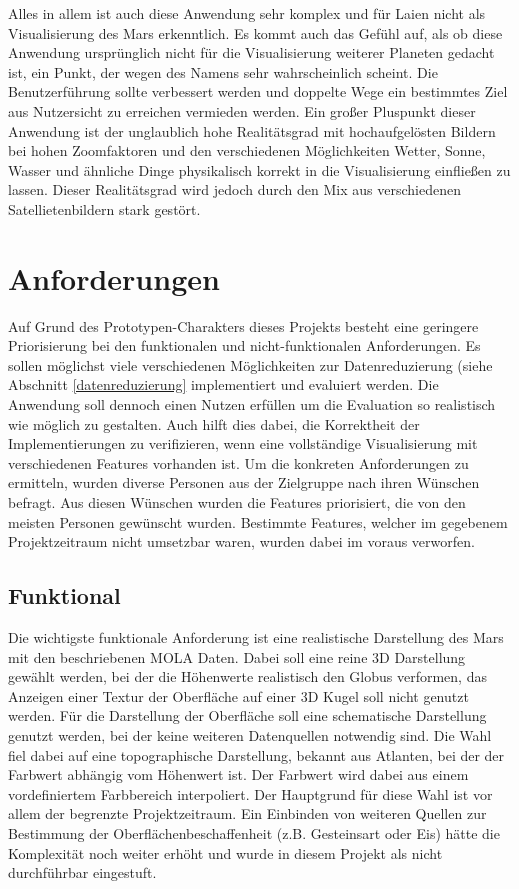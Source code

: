 Alles in allem ist auch diese Anwendung sehr komplex und für Laien nicht als Visualisierung des Mars erkenntlich. Es kommt auch das Gefühl auf, als ob diese Anwendung ursprünglich nicht für die Visualisierung weiterer Planeten gedacht ist, ein Punkt, der wegen des Namens sehr wahrscheinlich scheint. Die Benutzerführung sollte verbessert werden und doppelte Wege ein bestimmtes Ziel aus Nutzersicht zu erreichen vermieden werden. Ein großer Pluspunkt dieser Anwendung ist der unglaublich hohe Realitätsgrad mit hochaufgelösten Bildern bei hohen Zoomfaktoren und den verschiedenen Möglichkeiten Wetter, Sonne, Wasser und ähnliche Dinge physikalisch korrekt in die Visualisierung einfließen zu lassen. Dieser Realitätsgrad wird jedoch durch den Mix aus verschiedenen Satellietenbildern stark gestört.

\section{Anforderungen}
Auf Grund des Prototypen-Charakters dieses Projekts besteht eine geringere Priorisierung bei den funktionalen und nicht-funktionalen Anforderungen. Es sollen möglichst viele verschiedenen Möglichkeiten zur Datenreduzierung (siehe Abschnitt \ref{datenreduzierung} implementiert und evaluiert werden. Die Anwendung soll dennoch einen Nutzen erfüllen um die Evaluation so realistisch wie möglich zu gestalten. Auch hilft dies dabei, die Korrektheit der Implementierungen zu verifizieren, wenn eine vollständige Visualisierung mit verschiedenen Features vorhanden ist. Um die konkreten Anforderungen zu ermitteln, wurden diverse Personen aus der Zielgruppe nach ihren Wünschen befragt. Aus diesen Wünschen wurden die Features priorisiert, die von den meisten Personen gewünscht wurden. Bestimmte Features, welcher im gegebenem Projektzeitraum nicht umsetzbar waren, wurden dabei im voraus verworfen. 

\subsection{Funktional}
Die wichtigste funktionale Anforderung ist eine realistische Darstellung des Mars mit den beschriebenen MOLA Daten. Dabei soll eine reine 3D Darstellung gewählt werden, bei der die Höhenwerte realistisch den Globus verformen, das Anzeigen einer Textur der Oberfläche auf einer 3D Kugel soll nicht genutzt werden. Für die Darstellung der Oberfläche soll eine schematische Darstellung genutzt werden, bei der keine weiteren Datenquellen notwendig sind. Die Wahl fiel dabei auf eine topographische Darstellung, bekannt aus Atlanten, bei der der Farbwert abhängig vom Höhenwert ist. Der Farbwert wird dabei aus einem vordefiniertem Farbbereich interpoliert. Der Hauptgrund für diese Wahl ist vor allem der begrenzte Projektzeitraum. Ein Einbinden von weiteren Quellen zur Bestimmung der Oberflächenbeschaffenheit (z.B. Gesteinsart oder Eis) hätte die Komplexität noch weiter erhöht und wurde in diesem Projekt als nicht durchführbar eingestuft.


